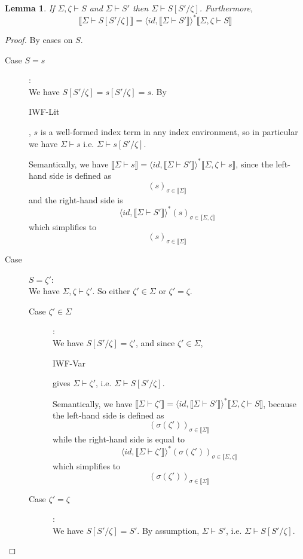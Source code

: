 \documentclass{article}
\newtheorem{lemma}{Lemma}
\newcommand{\sem}[1]{\llbracket #1 \rrbracket}
\newcommand{\sdisp}[1]{
\left( #1 \right)
}
\begin{document}
\begin{lemma}
If $\Sigma,\zeta \vdash S$ and $\Sigma \vdash S'$ then $\Sigma \vdash S[S'/\zeta]$. Furthermore, $$\sem{\Sigma \vdash S[S'/\zeta]} = \langle \mathit{id}, \sem{\Sigma \vdash S'} \rangle^* \sem{\Sigma,\zeta \vdash S}$$
\label{SWF-Subst}
\end{lemma}

\begin{proof}
By cases on $S$.

\begin{description}
\item[Case $S = s$]:\\
We have $S[S'/\zeta] = s[S'/\zeta] = s$. By \begin{sc}IWF-Lit\end{sc}, $s$ is a well-formed index term in any index environment, so in particular we have $\Sigma \vdash s$ i.e. $\Sigma \vdash s[S'/\zeta]$.

Semantically, we have $\sem{\Sigma \vdash s} = \langle \mathit{id}, \sem{\Sigma \vdash S'} \rangle^* \sem{\Sigma,\zeta \vdash s}$, since the left-hand side is defined as $$( s )_{\sigma \in \sem{\Sigma}}$$ and the right-hand side is $$\langle \mathit{id}, \sem{\Sigma \vdash S'} \rangle^* ( s )_{\sigma \in \sem{\Sigma,\zeta}}$$ which simplifies to $$ ( s )_{\sigma \in \sem{\Sigma}}$$

\item[Case ]$S = \zeta'$:\\
We have $\Sigma,\zeta \vdash \zeta'$. So either $\zeta' \in \Sigma$ or $\zeta' = \zeta$.

\begin{description}
\item[Case $\zeta' \in \Sigma$]:\\
We have $S[S'/\zeta] = \zeta'$, and since $\zeta' \in \Sigma$, \begin{sc}IWF-Var\end{sc} gives $\Sigma \vdash \zeta'$, i.e. $\Sigma \vdash S[S'/\zeta]$.

Semantically, we have $\sem{\Sigma \vdash \zeta'} = \langle \mathit{id}, \sem{\Sigma \vdash S'} \rangle^* \sem{\Sigma,\zeta \vdash S}$, because the left-hand side is defined as $$\sdisp{\sigma(\zeta')}_{\sigma \in \sem{\Sigma}}$$ while the right-hand side is equal to $$\langle \mathit{id}, \sem{\Sigma \vdash \zeta'} \rangle^* (\sigma(\zeta'))_{\sigma \in \sem{\Sigma,\zeta}}$$ which simplifies to $$(\sigma(\zeta'))_{\sigma \in \sem{\Sigma}}$$
 
\item[Case $\zeta' = \zeta$]:\\
We have $S[S'/\zeta] = S'$. By assumption, $\Sigma \vdash S'$, i.e. $\Sigma \vdash S[S'/\zeta]$.


\end{description}
\end{description}
\end{proof}
\end{document}

